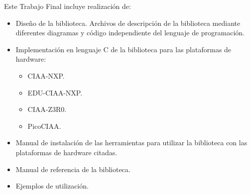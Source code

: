 Este Trabajo Final incluye realización de:

\begin{itemize}
   \item Diseño de la biblioteca. Archivos de descripción de la biblioteca mediante diferentes diagramas y código independiente del lenguaje de programación.
   \item Implementación en lenguaje C de la biblioteca para las plataformas de hardware:
   \begin{itemize}
      \item CIAA-NXP.
      \item EDU-CIAA-NXP.
      \item CIAA-Z3R0.
      \item PicoCIAA.
   \end{itemize}
   \item Manual de instalación de las herramientas para utilizar la biblioteca con las plataformas de hardware citadas.
   \item Manual de referencia de la biblioteca.
   \item Ejemplos de utilización.
\end{itemize}

